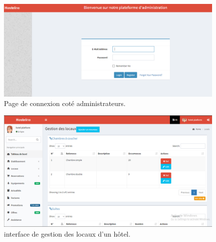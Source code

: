  \begin{figure}[h]
	\begin{center}
		\includegraphics[scale=0.5]{images/login_admin.png}
		\caption{Page de connexion coté administrateurs.}
		\label{synthese-cout-salardf}
	\end{center}
\end{figure}
 



 \begin{figure}[h]
	\begin{center}
		\includegraphics[scale=0.5]{images/ges_local.png}
		\caption{interface de gestion des locaux d’un hôtel.}
		\label{synthese-cout-s}
	\end{center}
\end{figure}


